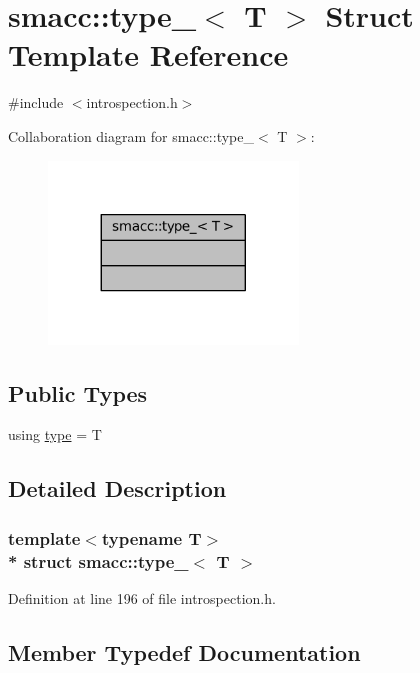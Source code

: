 \hypertarget{structsmacc_1_1type__}{}\section{smacc\+:\+:type\+\_\+$<$ T $>$ Struct Template Reference}
\label{structsmacc_1_1type__}


{\ttfamily \#include $<$introspection.\+h$>$}



Collaboration diagram for smacc\+:\+:type\+\_\+$<$ T $>$\+:
\nopagebreak
\begin{figure}[H]
\begin{center}
\leavevmode
\includegraphics[width=188pt]{structsmacc_1_1type____coll__graph}
\end{center}
\end{figure}
\subsection*{Public Types}
\begin{DoxyCompactItemize}
\item 
using \hyperlink{structsmacc_1_1type___a9b8fcdd94d0e9fc71366e867a4094463}{type} = T
\end{DoxyCompactItemize}


\subsection{Detailed Description}
\subsubsection*{template$<$typename T$>$\\*
struct smacc\+::type\+\_\+$<$ T $>$}



Definition at line 196 of file introspection.\+h.



\subsection{Member Typedef Documentation}
